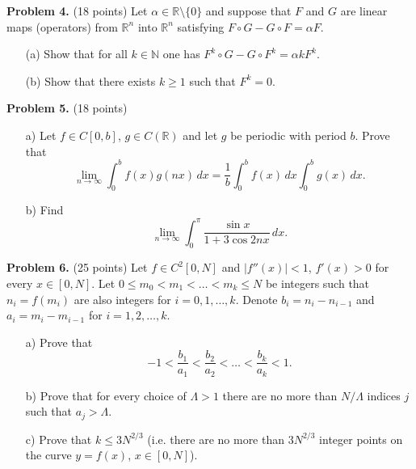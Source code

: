 \documentclass{article}
\begin{document}
\textbf{Problem 4.} (18 points) Let $\alpha \in \mathbb{R} \setminus \{0\}$ and suppose that $F$ and $G$ are linear maps (operators) from $\mathbb{R}^n$ into $\mathbb{R}^n$ satisfying $F \circ G - G \circ F = \alpha F$.
\begin{enumerate}
    \item[(a)] Show that for all $k \in \mathbb{N}$ one has $F^k \circ G - G \circ F^k = \alpha k F^k$.
    \item[(b)] Show that there exists $k \geq 1$ such that $F^k = 0$.
\end{enumerate}

\textbf{Problem 5.} (18 points)
\begin{enumerate}
    \item[a)] Let $f \in C[0, b]$, $g \in C(\mathbb{R})$ and let $g$ be periodic with period $b$. Prove that
    \[
    \lim_{n \to \infty} \int_{0}^{b} f(x)g(nx) \, dx = \frac{1}{b} \int_{0}^{b} f(x) \, dx \int_{0}^{b} g(x) \, dx.
    \]

    \item[b)] Find
    \[
    \lim_{n \to \infty} \int_{0}^{\pi} \frac{\sin x}{1 + 3\cos 2nx} \, dx.
    \]
\end{enumerate}

\textbf{Problem 6.} (25 points) Let $f \in C^2[0, N]$ and $|f''(x)| < 1$, $f'(x) > 0$ for every $x \in [0, N]$. Let $0 \leq m_0 < m_1 < \ldots < m_k \leq N$ be integers such that $n_i = f(m_i)$ are also integers for $i = 0, 1, \ldots, k$. Denote $b_i = n_i - n_{i-1}$ and $a_i = m_i - m_{i-1}$ for $i = 1, 2, \ldots, k$.
\begin{enumerate}
    \item[a)] Prove that
    \[
    -1 < \frac{b_1}{a_1} < \frac{b_2}{a_2} < \ldots < \frac{b_k}{a_k} < 1.
    \]

    \item[b)] Prove that for every choice of $\Lambda > 1$ there are no more than $N/\Lambda$ indices $j$ such that $a_j > \Lambda$.

    \item[c)] Prove that $k \leq 3N^{2/3}$ (i.e. there are no more than $3N^{2/3}$ integer points on the curve $y = f(x)$, $x \in [0, N]$).
\end{enumerate}
\end{document}
